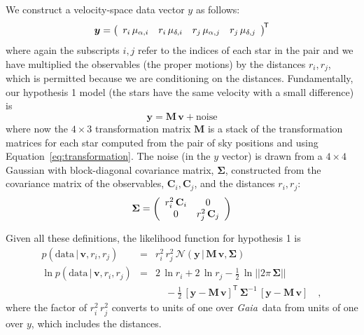 \documentclass[manuscript, letterpaper]{aastex6}
\newcommand{\project}[1]{\textsl{#1}}
\newcommand{\gaia}{\project{Gaia}}
\newcommand{\eqname}{Equation}
\newcommand{\given}{\,|\,}
\newcommand{\normal}{{\mathcal{N}}}
\newcommand{\transp}[1]{{#1}^{\!\mathsf{T}}}
\newcommand{\inv}[1]{{#1}^{-1}}
\newcommand{\bs}[1]{\boldsymbol{#1}}
\newcommand{\mat}[1]{\mathbf{#1}}
\renewcommand{\vec}[1]{\bs{#1}}
\newcommand{\data}{\mathrm{data}}
\begin{document}
We construct a velocity-space data vector $y$ as follows:
\begin{equation}
  \vec{y} =
    \transp{\left(
      \begin{array}{c c c c}
        r_i\,\mu_{\alpha,i} &
        r_i\,\mu_{\delta,i} &
        r_j\,\mu_{\alpha,j} &
        r_j\,\mu_{\delta,j}
      \end{array}
    \right)}
\end{equation}
where again the subscripts $i,j$ refer to the indices of each star in the pair
and we have multiplied the observables (the proper motions) by the distances
$r_i, r_j$, which is permitted because we are conditioning on the distances.
Fundamentally, our hypothesis 1 model (the stars have the same velocity with a
small difference) is
\begin{equation}
  \vec{y} = \mat{M} \, \vec{v} + \mathrm{noise}
\end{equation}
where now the $4 \times 3$ transformation matrix $\mat{M}$ is a stack of the
transformation matrices for each star computed from the pair of sky positions
and using \eqname~\ref{eq:transformation}.
The noise (in the $y$ vector) is drawn from a $4 \times 4$ Gaussian with
block-diagonal covariance matrix, $\mat{\Sigma}$, constructed from the
covariance matrix of the observables, $\mat{C}_i, \mat{C}_j$, and the distances
$r_i, r_j$:
\begin{equation}
  \mat{\Sigma} = \left(
    \begin{array}{c c}
      r_i^2 \, \mat{C}_i & 0 \\
      0 & r_j^2 \, \mat{C}_j
    \end{array}
  \right)
\end{equation}

Given all these definitions, the likelihood function for hypothesis 1 is
\begin{eqnarray}
  p(\data \given \vec{v}, r_i, r_j) &=& r_i^2\,r_j^2\,
    \normal(\vec{y} \given \mat{M}\,\vec{v}, \mat{\Sigma}) \\
  \ln p(\data \given \vec{v}, r_i, r_j) &=& 2\,\ln r_i + 2\,\ln r_j
    -\frac{1}{2}\,\ln||2\pi\,\mat{\Sigma}|| \nonumber \\
    && \quad -\frac{1}{2}\,\transp{[\vec{y}-\mat{M}\,\vec{v}]}\,
      \inv{\mat{\Sigma}}\,
      [\vec{y}-\mat{M}\,\vec{v}]
  \quad ,
\end{eqnarray}
where the factor of $r_i^2\,r_j^2$ converts to units of one over \gaia\ data
from units of one over $y$, which includes the distances.
\end{document}
